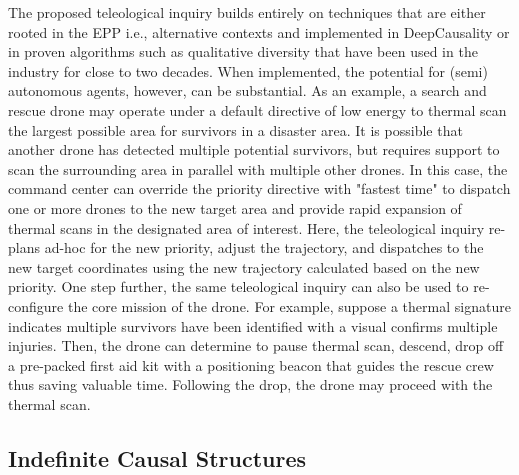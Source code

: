 The proposed teleological inquiry builds entirely on techniques that are either rooted in the EPP i.e., alternative contexts and implemented in DeepCausality or in proven algorithms such as qualitative diversity that have been used in the industry for close to two decades. When implemented, the potential for (semi) autonomous agents, however, can be substantial. As an example, a search and rescue drone may operate under a default directive of low energy to thermal scan the largest possible area for survivors in a disaster area. It is possible that another drone has detected multiple potential survivors, but requires support to scan the surrounding area in parallel with multiple other drones. In this case, the command center can override the priority directive with "fastest time" to dispatch one or more drones to the new target area and provide rapid expansion of thermal scans in the designated area of interest. Here, the teleological inquiry re-plans ad-hoc for the new priority, adjust the trajectory, and dispatches to the new target coordinates using the new trajectory calculated based on the new priority. One step further, the same teleological inquiry can also be used to re-configure the core mission of the drone. For example, suppose a thermal signature indicates multiple survivors have been identified with a visual confirms multiple injuries. Then, the drone can determine to pause thermal scan, descend, drop off a pre-packed first aid kit with a positioning beacon that guides the rescue crew thus saving valuable time. Following the drop, the drone may proceed with the thermal scan.  
  
  



\subsection{Indefinite Causal Structures}

